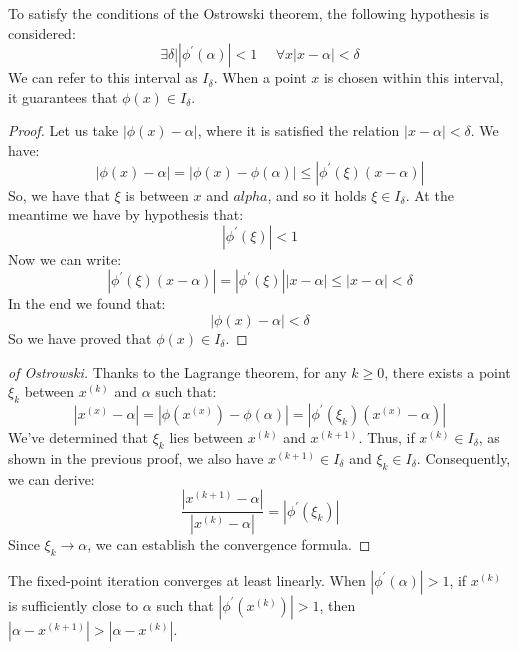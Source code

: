 \documentclass[12pt, a4paper]{report}
\begin{document}
    To satisfy the conditions of the Ostrowski theorem, the following hypothesis is considered:
    \[\exists \delta | \left\lvert \phi^{'}(\alpha) \right\rvert < 1 \:\:\:\:\:\: \forall x \left\lvert x - \alpha \right\rvert < \delta\]
    We can refer to this interval as $I_{\delta}$. 
    When a point $x$ is chosen within this interval, it guarantees that $\phi(x)\in I_{\delta}$. 
    \begin{proof}
        Let us take $\left\lvert \phi(x)-\alpha \right\rvert$, where it is satisfied the relation $\left\lvert x- \alpha \right\rvert < \delta$. 
        We have:
        \[\left\lvert \phi(x)-\alpha \right\rvert=\left\lvert \phi(x)-\phi(\alpha) \right\rvert \leq \left\lvert \phi^{'}(\xi)(x-\alpha) \right\rvert \]
        So, we have that $\xi$ is between $x$ and $alpha$, and so it holds $\xi \in I_{\delta}$. 
        At the meantime we have by hypothesis that: 
        \[\left\lvert \phi^{'}(\xi) \right\rvert < 1\]
        Now we can write:
        \[\left\lvert \phi^{'}(\xi)(x-\alpha) \right\rvert = \left\lvert \phi^{'}(\xi) \right\rvert \left\lvert x-\alpha \right\rvert \leq \left\lvert x-\alpha \right\rvert < \delta\]
        In the end we found that: 
        \[\left\lvert \phi(x)-\alpha \right\rvert < \delta\]
        So we have proved that $\phi(x) \in I_{\delta}$. 
    \end{proof}
    \begin{proof}[of Ostrowski]
        Thanks to the Lagrange theorem, for any $k \geq 0$, there exists a point $\xi_k$ between $x^{(k)}$ and $\alpha$ such that: 
        \[\left\lvert x^{(x)}-\alpha\right\rvert=\left\lvert\phi(x^{(x)})-\phi(\alpha)\right\rvert=\left\lvert\phi^{'}(\xi_k)(x^{(x)}-\alpha)\right\rvert\]
        We've determined that $\xi_k$ lies between $x^{(k)}$ and $x^{(k+1)}$. 
        Thus, if $x^{(k)} \in I_{\delta}$, as shown in the previous proof, we also have $x^{(k+1)} \in I_{\delta}$ and $\xi_k \in I_{\delta}$. 
        Consequently, we can derive:
        \[\dfrac{\left\lvert x^{(k+1)}-\alpha\right\rvert }{\left\lvert x^{(k)}-\alpha\right\rvert }=\left\lvert \phi^{'}(\xi_k)\right\rvert \]
        Since $\xi_k \rightarrow \alpha$, we can establish the convergence formula.
    \end{proof}
    The fixed-point iteration converges at least linearly. 
    When $\left\lvert\phi^{'}(\alpha)\right\rvert>1$, if $x^{(k)}$ is sufficiently close to $\alpha$ such that 
    $\left\lvert \phi^{'}(x^{(k)}) \right\rvert > 1$, then $\left\lvert \alpha - x^{(k+1)} \right\rvert > \left\lvert \alpha - x^{(k)} \right\rvert$. 
\end{document}

